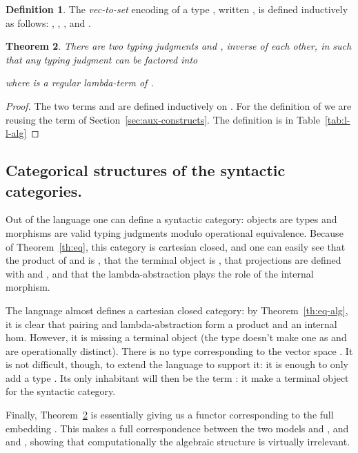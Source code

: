\documentclass[10pt]{article}
\theoremstyle{plain}
\newtheorem{theorem}{Theorem}
\theoremstyle{definition}
\newtheorem{definition}[theorem]{Definition}
\newcommand{\define}[1]{{\em #1}}
\begin{document}
\begin{definition}
  The \define{vec-to-set} encoding of a type , written
  , is defined inductively as follows:
  ,
  , , and .
\end{definition}

\begin{theorem}
  \label{th:l-l-alg}
  There are two typing judgments  and , inverse of each other, in  such that any typing judgment  can be
  factored into
  
  where  is a regular lambda-term of .
\end{theorem}
\begin{proof}
The two terms  and  are
defined inductively on .
For the definition of  we are
reusing the term  of Section~\ref{sec:aux-constructs}.
The definition is in Table~\ref{tab:l-l-alg}
\end{proof}

\subsection{Categorical structures of the syntactic categories.}
\label{sec:categ-struct-synt}

Out of the language  one can define a syntactic 
category: objects are
types and morphisms  are valid typing judgments  modulo
operational equivalence. 
Because of Theorem~\ref{th:eq}, this category is
cartesian closed, and one can easily see that the product of 
and  is , that the terminal
object is , that
projections are defined with  and , and that the
lambda-abstraction plays the role of the internal morphism.



The language  almost defines a cartesian closed category: by
Theorem~\ref{th:eq-alg}, it is clear that pairing and lambda-abstraction form a
product and an internal hom. However, it is missing a terminal object
(the type  doesn't make one as  and
 are operationally distinct). There is no type
corresponding to the vector space . It is not
difficult, though, to extend
the language to support it: it is enough to only add a type . Its only
inhabitant will then be the term : it make a terminal
object for the syntactic
category.

Finally, Theorem~\ref{th:l-l-alg} is essentially giving us a functor
 corresponding to the full embedding
. This makes
a full correspondence between the two models  and , and
 and , showing that computationally the algebraic
structure is virtually irrelevant.
\end{document}
